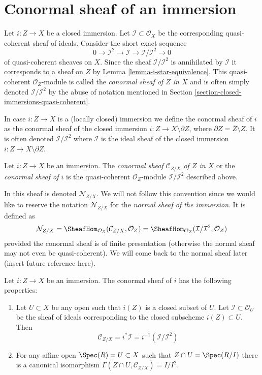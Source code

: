 \section{Conormal sheaf of an immersion}
\label{section-conormal-sheaf}

\noindent
Let $i : Z \to X$ be a closed immersion. Let
$\mathcal{I} \subset \mathcal{O}_X$ be the corresponding quasi-coherent
sheaf of ideals. Consider the short exact sequence
$$
0 \to \mathcal{I}^2 \to \mathcal{I} \to \mathcal{I}/\mathcal{I}^2 \to 0
$$
of quasi-coherent sheaves on $X$. Since the sheaf $\mathcal{I}/\mathcal{I}^2$
is annihilated by $\mathcal{I}$ it corresponds to a sheaf on $Z$ by
Lemma \ref{lemma-i-star-equivalence}. This quasi-coherent
$\mathcal{O}_Z$-module is called the {\it conormal sheaf of $Z$ in $X$}
and is often simply denoted
$\mathcal{I}/\mathcal{I}^2$ by the abuse of notation mentioned in
Section \ref{section-closed-immersions-quasi-coherent}.

\medskip\noindent
In case $i : Z \to X$ is a (locally closed) immersion we define the
conormal sheaf of $i$ as the conormal sheaf of the closed
immersion $i : Z \to X \setminus \partial Z$, where
$\partial Z = \overline{Z} \setminus Z$. It is often denoted
$\mathcal{I}/\mathcal{I}^2$ where $\mathcal{I}$ is the ideal sheaf
of the closed immersion $i : Z \to X \setminus \partial Z$.

\begin{definition}
\label{definition-conormal-sheaf}
Let $i : Z \to X$ be an immersion. The {\it conormal sheaf
$\mathcal{C}_{Z/X}$ of $Z$ in $X$} or the {\it conormal sheaf of $i$}
is the quasi-coherent $\mathcal{O}_Z$-module $\mathcal{I}/\mathcal{I}^2$
described above.
\end{definition}

\noindent
In \cite[IV Definition 16.1.2]{EGA} this sheaf is denoted
$\mathcal{N}_{Z/X}$. We will not follow this convention since we would
like to reserve the notation $\mathcal{N}_{Z/X}$
for the {\it normal sheaf of the immersion}. It is defined as
$$
\mathcal{N}_{Z/X} =
\SheafHom_{\mathcal{O}_Z}(\mathcal{C}_{Z/X}, \mathcal{O}_Z) =
\SheafHom_{\mathcal{O}_Z}(\mathcal{I}/\mathcal{I}^2, \mathcal{O}_Z)
$$
provided the conormal sheaf is of finite presentation (otherwise the
normal sheaf may not even be quasi-coherent). We will come back to the
normal sheaf later (insert future reference here).

\begin{lemma}
\label{lemma-affine-conormal}
Let $i : Z \to X$ be an immersion. The conormal sheaf
of $i$ has the following properties:
\begin{enumerate}
\item Let $U \subset X$ be any open such that $i(Z)$ is
a closed subset of $U$. Let $\mathcal{I} \subset \mathcal{O}_U$
be the sheaf of ideals corresponding to the closed subscheme
$i(Z) \subset U$. Then
$$
\mathcal{C}_{Z/X} = i^*\mathcal{I} = i^{-1}(\mathcal{I}/\mathcal{I}^2)
$$
\item
For any affine open $\Spec(R) = U \subset X$
such that $Z \cap U = \Spec(R/I)$ there is a
canonical isomorphism
$\Gamma(Z \cap U, \mathcal{C}_{Z/X}) = I/I^2$.
\end{enumerate}
\end{lemma}

